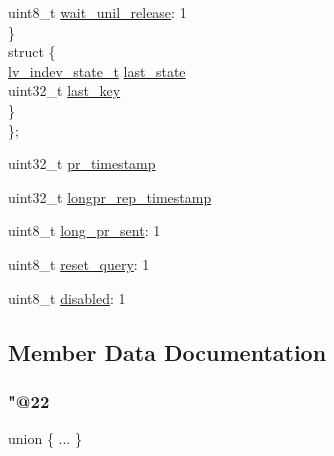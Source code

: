 \begin{DoxyCompactItemize}
\begin{tabbing}
\>\>uint8\_t \mbox{\hyperlink{struct__lv__indev__proc__t_a7c79d003eea22b07936488c1b99cffbc}{wait\_unil\_release}}: 1\\
\>\} \\
\>struct \{\\
\>\>\mbox{\hyperlink{lv__hal__indev_8h_aacdf3efce400e71895f5efb42ee24956}{lv\_indev\_state\_t}} \mbox{\hyperlink{struct__lv__indev__proc__t_a85c684f0eccad01a4f7cfe4ab4ebab89}{last\_state}}\\
\>\>uint32\_t \mbox{\hyperlink{struct__lv__indev__proc__t_af5b18f4a595a9a1b74a7665b5e55f42b}{last\_key}}\\
\>\} \\
\}; \\

\end{tabbing}\item 
uint32\+\_\+t \mbox{\hyperlink{struct__lv__indev__proc__t_a610fbc71cd450b55c0ad5fdf38dfaf5a}{pr\+\_\+timestamp}}
\item 
uint32\+\_\+t \mbox{\hyperlink{struct__lv__indev__proc__t_a943cbd9cf549902dc4cfae4fbcea181f}{longpr\+\_\+rep\+\_\+timestamp}}
\item 
uint8\+\_\+t \mbox{\hyperlink{struct__lv__indev__proc__t_a69c492deb716c6f9e9ce7bd1e691c19d}{long\+\_\+pr\+\_\+sent}}\+: 1
\item 
uint8\+\_\+t \mbox{\hyperlink{struct__lv__indev__proc__t_ab7a4b61acd0befd72fd772d2e51704f5}{reset\+\_\+query}}\+: 1
\item 
uint8\+\_\+t \mbox{\hyperlink{struct__lv__indev__proc__t_af72a80aed5ad581416e5c33dfe3e93f8}{disabled}}\+: 1
\end{DoxyCompactItemize}


\subsection{Member Data Documentation}
\mbox{\label{struct__lv__indev__proc__t_a553dea61f6ce645a95ba1a210391b754}} 
\subsubsection{\texorpdfstring{"@22}{@22}}
{\footnotesize\ttfamily union \{ ... \} }

\mbox{\label{struct__lv__indev__proc__t_a418af1d0a3452e6c97d22f6a690c2927}} 
